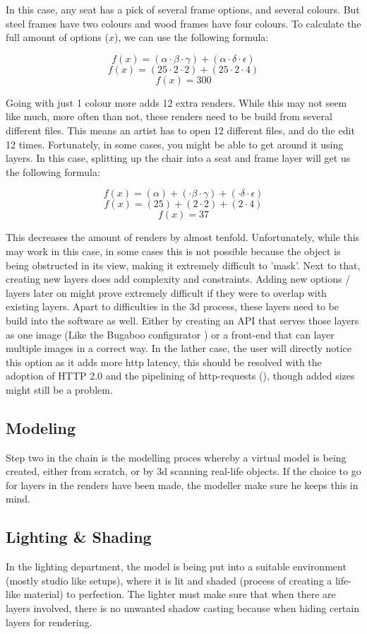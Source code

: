 In this case, any seat has a pick of several frame options, and several colours. But steel frames have two colours and wood frames have four colours. To calculate the full amount of options ($x$), we can use the following formula:
 
\[ f(x) = (\alpha \cdot \beta \cdot \gamma) + (\alpha \cdot \delta \cdot \epsilon)\]
\[ f(x) = (25 \cdot 2 \cdot 2) + (25 \cdot 2 \cdot 4)\]
\[ f(x) = 300\]

Going with just 1 colour more adds 12 extra renders. While this may not seem like much, more often than not, these renders need to be build from several different files. This means an artist has to open 12 different files, and do the edit 12 times.
Fortunately, in some cases, you might be able to get around it using layers. In this case, splitting up the chair into a seat and frame layer will get us the following formula:

\[ f(x) = (\alpha) + (\cdot \beta \cdot \gamma) + (\cdot \delta \cdot \epsilon)\]
\[ f(x) = (25) + (2 \cdot 2) + (2 \cdot 4)\]
\[ f(x) = 37\]

This decreases the amount of renders by almost tenfold. Unfortunately, while this may work in this case, in some cases this is not possible because the object is being obstructed in its view, making it extremely difficult to 'mask'. Next to that, creating new layers does add complexity and constraints. Adding new options / layers later on might prove extremely difficult if they were to overlap with existing layers.
\newline
Apart to difficulties in the 3d process, these layers need to be build into the software as well. Either by creating an API that serves those layers as one image (Like the Bugaboo configurator \cite{Bugaboo} ) or a front-end that can layer multiple images in a correct way. In the lather case, the user will directly notice this option as it adds more http latency, this should be resolved with the adoption of HTTP 2.0 and the pipelining of http-requests (\cite{latency}), though added sizes might still be a problem.

\subsection{Modeling}
Step two in the chain is the modelling proces whereby a virtual model is being created, either from scratch, or by 3d scanning real-life objects. If the choice to go for layers in the renders have been made, the modeller make sure he keeps this in mind.
\subsection{Lighting \& Shading}
In the lighting department, the model is being put into a suitable environment (mostly studio like setups), where it is lit and shaded (process of creating a life-like material) to perfection. The lighter must make sure that when there are layers involved, there is no unwanted shadow casting because when hiding certain layers for rendering.
